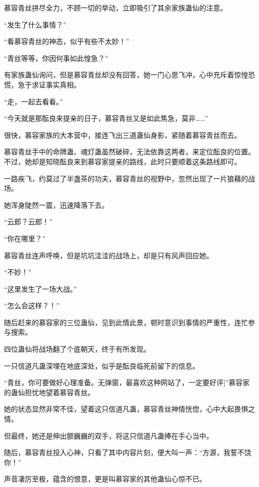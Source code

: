 
\begin{this_body}



慕容青丝拼尽全力，不顾一切的举动，立即吸引了其余家族蛊仙的注意。

“发生了什么事情？”

“看慕容青丝的神态，似乎有些不太妙！”

“青丝等等，你因何事如此惶急？”

有家族蛊仙询问，但是慕容青丝却没有回答，她一门心思飞冲，心中充斥着惊惶恐慌，急于求证事实真相。

“走，一起去看看。”

“今天就是那酝良来提亲的日子，慕容青丝又是如此焦急，莫非……”

很快，慕容家族的大本营中，接连飞出三道蛊仙身影，紧随着慕容青丝而去。

慕容青丝手中的命牌蛊、魂灯蛊虽然破碎，无法依靠这两者，来定位酝良的位置。不过，她却是知晓酝良来到慕容家提亲的路线，此时只要顺着这条路线即可。

一路疾飞，约莫过了半盏茶的功夫，慕容青丝的视野中，忽然出现了一片狼藉的战场。

她浑身陡然一震，迅速降落下去。

“云郎？云郎！”

“你在哪里？”

慕容青丝连声呼唤，但是坑坑洼洼的战场上，却是只有风声回应她。

“不妙！”

“这里发生了一场大战。”

“怎么会这样？！”

随后赶来的慕容家的三位蛊仙，见到此情此景，顿时意识到事情的严重性，连忙参与搜索。

四位蛊仙将战场翻了个底朝天，终于有所发现。

一只信道凡蛊深埋在地底深处，似乎是酝良临死前留下的信息。

“青丝，你可要做好心理准备。无弹窗，最喜欢这种网站了，一定要好评]”慕容家的蛊仙担忧地望着慕容青丝。

她的状态显然非常不佳，望着这只信道凡蛊，慕容青丝神情恍惚，心中大起畏惧之情。

但最终，她还是伸出颤巍巍的双手，将这只信道凡蛊捧在手心当中。

随后，慕容青丝投入心神，只看了其中内容片刻，便大叫一声：“方源，我誓不饶你！”

声音凄厉至极，蕴含的恨意，更是叫慕容家的其他蛊仙心惊不已。


\end{this_body}
